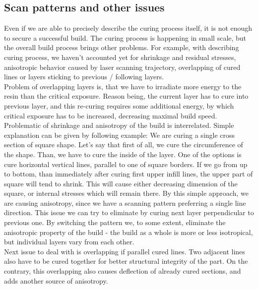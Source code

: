 \documentclass[a4paper, twoside, 11pt]{report}
\begin{document}
\subsection{Scan patterns and other issues}
Even if we are able to precisely describe the curing process itself, it is not enough to secure a successful build. The curing process is happening in small scale, but the overall build process brings other problems. For example, with describing curing process, we haven't accounted yet for shrinkage and residual stresses, anisotropic behavior caused by laser scanning trajectory, overlapping of cured lines or layers sticking to previous / following layers.\\
Problem of overlapping layers is, that we have to irradiate more energy to the resin than the critical exposure. Reason being, the current layer has to cure into previous layer, and this re-curing requires some additional energy, by which critical exposure has to be increased, decreasing maximal build speed.\\
Problematic of shrinkage and anisotropy of the build is interrelated. Simple explanation can be given by following example: We are curing a single cross section of square shape. Let's say that first of all, we cure the circumference of the shape. Than, we have to cure the inside of the layer. One of the options is cure horizontal vertical lines, parallel to one of square borders. If we go from up to bottom, than immediately after curing first upper infill lines, the upper part of square will tend to shrink. This will cause either decreasing dimension of the square, or internal stresses which will remain there.  By this simple approach, we are causing anisotropy, since we have a scanning pattern preferring a single line direction. This issue we can try to eliminate by curing next layer perpendicular to previous one. By switching the pattern we, to some extent, eliminate the anisotropic property of the build - the build as a whole is more or less isotropical, but individual layers vary from each other.\\
Next issue to deal with is overlapping if parallel cured lines. Two adjacent lines also have to be cured together for better structural integrity of the part. On the contrary, this overlapping also causes deflection of already cured sections, and adds another source of anisotropy.
\end{document}
